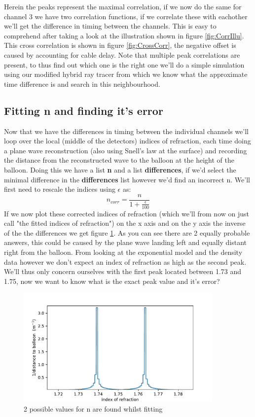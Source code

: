 \documentclass[11pt,a4paper,faculty=we,language=en,doctype=report]{cls/ugent-doc}
\begin{document}
Herein the peaks represent the maximal correlation, if we now do the same for
channel 3 we have two correlation functions, if we correlate these with
eachother we'll get the difference in timing between the channels.  This is
easy to comprehend after taking a look at the illustration shown in figure
\ref{fig:CorrIllu}. This cross correlation is shown in figure
\ref{fig:CrossCorr}, the negative offset is caused by accounting for cable
delay. Note that multiple peak correlations are present, to thus find out which
one is the right one we'll do a simple simulation using our modified hybrid ray
tracer from which we know what the approximate time difference is and search in
this neighbourhood.

\subsection{Fitting n and finding it's error}
Now that we have the differences in timing between the individual channels we'll loop
over the local (middle of the detectors) indices of refraction, each time doing a plane
wave reconstruction (also using Snell's law at the surface) and recording the distance
from the reconstructed wave to the balloon at the height of the balloon.
Doing this we have a list \textbf{n} and a list \textbf{differences}, if we'd select
the minimal difference in the \textbf{differences} list however we'd find an incorrect
n. We'll first need to rescale the indices using $\epsilon$ as:
\begin{equation}
	n_{corr} = \frac{n}{1+\frac{\epsilon}{100}}
\end{equation}
If we now plot these corrected indices of refraction (which we'll from now on
just call "the fitted indices of refraction") on the x axis and on the y axis
the inverse of the the differences we get figure \ref{fig:2PeakFit}. As you can
see there are 2 equally probable answers, this could be caused by the plane
wave landing left and equally distant right from the balloon. From looking at
the exponential model and the density data however we don't expect an index of
refraction as high as the second peak. We'll thus only concern ourselves with
the first peak located between 1.73 and 1.75, now we want to know what is the
exact peak value and it's error?
\begin{figure}
	\centering
	\includegraphics[width=0.9\textwidth]{TryingToFindn.pdf}
	\caption{2 possible values for n are found whilst fitting}
	\label{fig:2PeakFit}
\end{figure}
\end{document}
